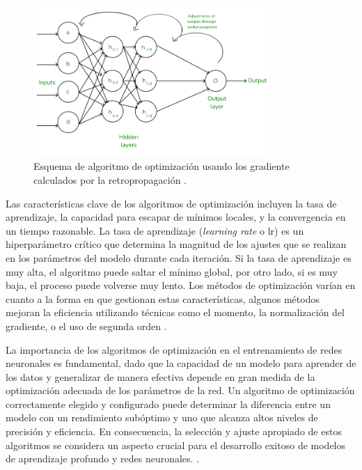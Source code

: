 \begin{figure}[H]
    \centering
    \includegraphics[width=0.8\textwidth]{./img/modelo/retropropagacion.png}
    \caption{Esquema de algoritmo de optimización usando los gradiente calculados por la retropropagación \cite{msmk2023backpropagation}.}
    \label{fig:esq-Optimizacion}
\end{figure}



Las características clave de los algoritmos de optimización incluyen la tasa de aprendizaje, la capacidad para escapar de mínimos locales, y la convergencia en un tiempo razonable. La tasa de aprendizaje (\textit{learning rate} o lr) es un hiperparámetro crítico que determina la magnitud de los ajustes que se realizan en los parámetros del modelo durante cada iteración. Si la tasa de aprendizaje es muy alta, el algoritmo puede saltar el mínimo global, por otro lado, si es muy baja, el proceso puede volverse muy lento. Los métodos de optimización varían en cuanto a la forma en que gestionan estas características, algunos métodos mejoran la eficiencia utilizando técnicas como el momento, la normalización del gradiente, o el uso de segunda orden \cite{kingma2014adam}.


La importancia de los algoritmos de optimización en el entrenamiento de redes neuronales es fundamental, dado que la capacidad de un modelo para aprender de los datos y generalizar de manera efectiva depende en gran medida de la optimización adecuada de los parámetros de la red. Un algoritmo de optimización correctamente elegido y configurado puede determinar la diferencia entre un modelo con un rendimiento subóptimo y uno que alcanza altos niveles de precisión y eficiencia. En consecuencia, la selección y ajuste apropiado de estos algoritmos se considera un aspecto crucial para el desarrollo exitoso de modelos de aprendizaje profundo y redes neuronales. \cite{goodfellow2016deep}.


